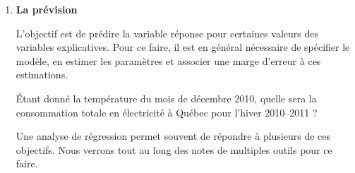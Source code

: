 \begin{enumerate}
\item \textbf{La prévision}

L'objectif est de prédire la variable réponse pour certaines valeurs des variables explicatives. Pour ce faire, il est en général nécessaire de  spécifier le modèle, en estimer les paramètres et associer une marge d'erreur à ces estimations.

\begin{exemple}
    \'Etant donn\'e la température du mois de décembre 2010, quelle sera la consommation totale en électricité à Québec pour l'hiver 2010--2011 ?
\end{exemple}

Une analyse de régression permet souvent de répondre à plusieurs de ces objectifs. Nous verrons tout au long des notes de multiples outils pour ce faire.

\end{enumerate}

